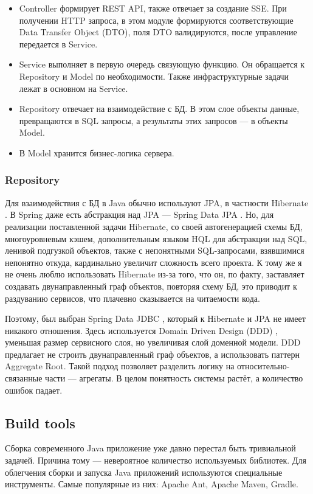 \begin{itemize}
    \item Controller формирует REST API, также отвечает за создание SSE.
          При получении HTTP запроса, в этом модуле формируются соответствующие Data Transfer Object (DTO),
          поля DTO валидируются, после управление передается в Service.
    \item Service выполняет в первую очередь связующую функцию.
          Он обращается к Repository и Model по необходимости.
          Также инфраструктурные задачи лежат в основном на Service.
    \item Repository отвечает на взаимодействие с БД.
          В этом слое объекты данные, превращаются в SQL запросы, а результаты этих запросов --- в объекты Model.
    \item В Model хранится бизнес-логика сервера.
\end{itemize}

\subsubsection{Repository}
Для взаимодействия с БД в Java обычно используют JPA, в частности Hibernate \cite{HibernateReference}.
В Spring даже есть абстракция над JPA --- Spring Data JPA \cite{SpringDataJPAReference}.
Но, для реализации поставленной задачи Hibernate, со своей автогенерацией схемы БД, многоуровневым кэшем, дополнительным языком HQL для абстракции над SQL, ленивой подгузкой объектов, также с непонятными SQL-запросами, взявшимися непонятно откуда, кардинально увеличит сложность всего проекта.
К тому же я не очень люблю использовать Hibernate из-за того, что он, по факту, заставляет создавать двунаправленный граф объектов, повторяя схему БД, это приводит к раздуванию сервисов, что плачевно сказывается на читаемости кода.

Поэтому, был выбран Spring Data JDBC \cite{SpringDataJDBCReference}, который к Hibernate и JPA не имеет никакого отношения.
Здесь используется Domain Driven Design (DDD) \cite{EricEvansDDD}, уменьшая размер сервисного слоя, но увеличивая слой доменной модели.
DDD предлагает не строить двунаправленный граф объектов, а использовать паттерн Aggregate Root.
Такой подход позволяет разделить логику на относительно-связанные части --- агрегаты.
В целом понятность системы растёт, а количество ошибок падает.

\subsection{Build tools}
Сборка современного Java приложение уже давно перестал быть тривиальной задачей.
Причина тому --- невероятное количество используемых библиотек.
Для облегчения сборки и запуска Java приложений используются специальные инструменты.
Самые популярные из них: Apache Ant, Apache Maven, Gradle.

